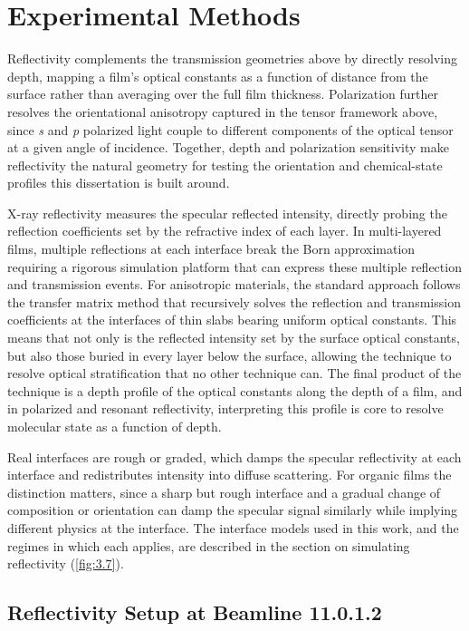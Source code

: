 \section{Experimental Methods}\label{sec:experimental-methods}

Reflectivity complements the transmission geometries above by directly resolving depth, mapping a film's optical constants as a function of distance from the surface rather than averaging over the full film thickness. Polarization further resolves the orientational anisotropy captured in the tensor framework above, since \emph{s} and \emph{p} polarized light couple to different components of the optical tensor at a given angle of incidence. Together, depth and polarization sensitivity make reflectivity the natural geometry for testing the orientation and chemical-state profiles this dissertation is built around.

X-ray reflectivity measures the specular reflected intensity, directly probing the reflection coefficients set by the refractive index of each layer. In multi-layered films, multiple reflections at each interface break the Born approximation requiring a rigorous simulation platform that can express these multiple reflection and transmission events. For anisotropic materials, the standard approach follows the transfer matrix method that recursively solves the reflection and transmission coefficients at the interfaces of thin slabs bearing uniform optical constants. This means that not only is the reflected intensity set by the surface optical constants, but also those buried in every layer below the surface, allowing the technique to resolve optical stratification that no other technique can. The final product of the technique is a depth profile of the optical constants along the depth of a film, and in polarized and resonant reflectivity, interpreting this profile is core to resolve molecular state as a function of depth.

Real interfaces are rough or graded, which damps the specular reflectivity at each interface and redistributes intensity into diffuse scattering. For organic films the distinction matters, since a sharp but rough interface and a gradual change of composition or orientation can damp the specular signal similarly while implying different physics at the interface. The interface models used in this work, and the regimes in which each applies, are described in the section on simulating reflectivity (\cref{fig:3.7}).

\subsection{Reflectivity Setup at Beamline 11.0.1.2}\label{sec:reflectivity-setup-at-11.0.1.2}

